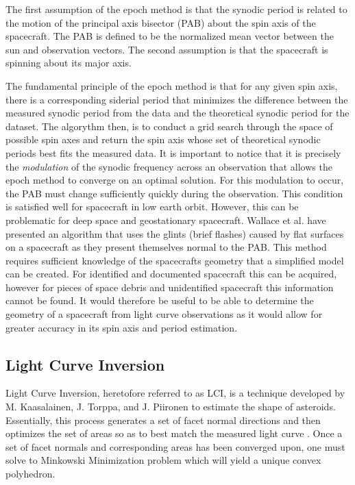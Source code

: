 \documentclass{article}
\begin{document}
The first assumption of the epoch method is that the synodic period is related to the motion of the principal axis bisector (PAB) about the spin axis of the spacecraft. The PAB is defined to be the normalized mean vector between the sun and observation vectors. The second assumption is that the spacecraft is spinning about its major axis.



The fundamental principle of the epoch method is that for any given spin axis, there is a corresponding siderial period that minimizes the difference between the measured synodic period from the data and the theoretical synodic period for the dataset. The algorythm then, is to conduct a grid search through the space of possible spin axes and return the spin axis whose set of theoretical synodic periods best fits the measured data.
It is important to notice that it is precisely the \textit{modulation} of the synodic frequency across an observation that allows the epoch method to converge on an optimal solution. \cite{Wallace} For this modulation to occur, the PAB must change sufficiently quickly during the observation. This condition is satisfied well for spacecraft in low earth orbit. However, this can be problematic for deep space and geostationary spacecraft.
Wallace et al. \cite{Wallace} have presented an algorithm that uses the glints (brief flashes) caused by flat surfaces on a spacecraft as they present themselves normal to the PAB. This method requires sufficient knowledge of the spacecrafts geometry that a simplified model can be created. For identified and documented spacecraft this can be acquired, however for pieces of space debris and unidentified spacecraft this information cannot be found. It would therefore be useful to be able to determine the geometry of a spacecraft from light curve observations as it would allow for greater accuracy in its spin axis and period estimation.

\subsection{Light Curve Inversion}

Light Curve Inversion, heretofore referred to as LCI, is a technique developed by M. Kaasalainen, J. Torppa, and J. Piironen \cite{KAASALAINEN2002369} to estimate the shape of asteroids. Essentially, this process generates a set of facet normal directions and then optimizes the set of areas so as to best match the measured light curve \cite{Kaasalainen}. Once a set of facet normals and corresponding areas has been converged upon, one must solve to Minkowski Minimization problem \cite{Minkowski1989} which will yield a unique convex polyhedron.
\end{document}
